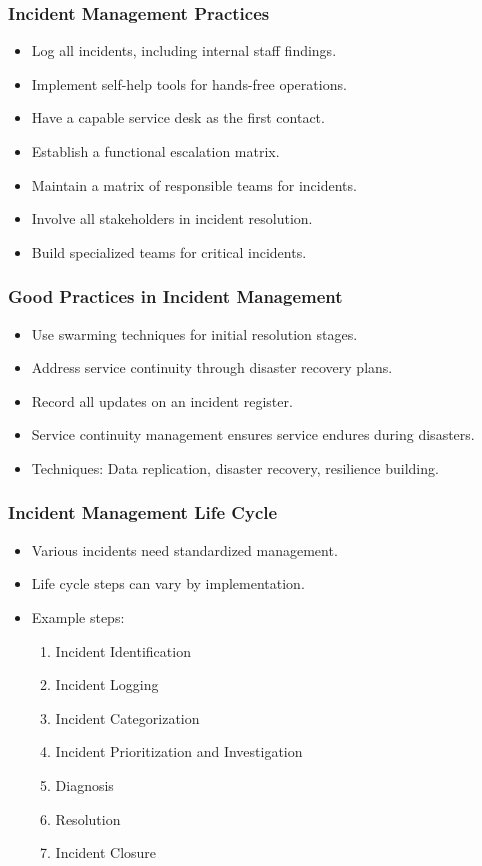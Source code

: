 \documentclass[aspectratio=169, table]{beamer}
\begin{document}
\begin{frame}
	\frametitle{Incident Management Practices}
	\begin{itemize}
		\item Log all incidents, including internal staff findings.
		\item Implement self-help tools for hands-free operations.
		\item Have a capable service desk as the first contact.
		\item Establish a functional escalation matrix.
		\item Maintain a matrix of responsible teams for incidents.
		\item Involve all stakeholders in incident resolution.
		\item Build specialized teams for critical incidents.
	\end{itemize}
\end{frame}

\begin{frame}
	\frametitle{Good Practices in Incident Management}
	\begin{itemize}
		\item Use swarming techniques for initial resolution stages.
		\item Address service continuity through disaster recovery plans.
		\item Record all updates on an incident register.
		\item Service continuity management ensures service endures during disasters.
		\item Techniques: Data replication, disaster recovery, resilience building.
	\end{itemize}
\end{frame}

\begin{frame}
	\frametitle{Incident Management Life Cycle}
	\begin{itemize}
		\item Various incidents need standardized management.
		\item Life cycle steps can vary by implementation.
		\item Example steps:
		\begin{enumerate}
			\item Incident Identification
			\item Incident Logging
			\item Incident Categorization
			\item Incident Prioritization and Investigation
			\item Diagnosis
			\item Resolution
			\item Incident Closure
		\end{enumerate}
	\end{itemize}
\end{frame}
\end{document}
